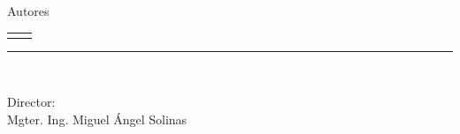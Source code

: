 \begin{titlepage}
\begin{center}
        \vspace*{0.3in}
        \begin{large} Autores
        \end{large}
        \begin{center}
            \begin{tabular}{ p{} p{} }
            		\centering {Figueroa Sergio David}&
            		\centering {Sepulveda Federico Nicolás}
            \end{tabular}
        \end{center}
        \vspace*{0.3mm}
        \rule{100mm}{0.1mm}\\
        \vspace*{0.3mm}
        \begin{large}
            Director: \\
            Mgter. Ing. Miguel Ángel Solinas \\
        \end{large}
        

    \end{center}

\end{titlepage}
